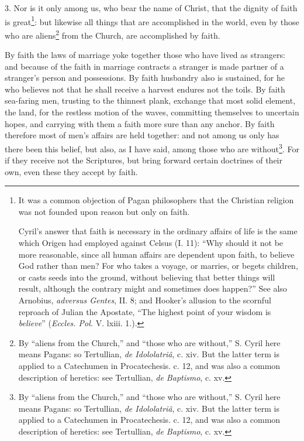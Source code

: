 3. Nor is it only among us, who bear the name of Christ, that the dignity of faith is great\footnote{It was a common objection of Pagan philosophers that the Christian religion was not founded upon reason but only on faith. \par Cyril’s answer that faith is necessary in the ordinary affairs of life is the same which Origen had employed against Celsus (I. 11): “Why should it not be more reasonable, since all human affairs are dependent upon faith, to believe God rather than men? For who takes a voyage, or marries, or begets children, or casts seeds into the ground, without believing that better things will result, although the contrary might and sometimes does happen?” See also Arnobius, \emph{adversus Gentes}, II. 8; and Hooker’s allusion to the scornful reproach of Julian the Apostate, “The highest point of your wisdom is \emph{believe}” (\emph{Eccles. Pol.} V. lxiii. 1.).}: but likewise all things that are accomplished in the world, even by those who are aliens\footnote{By “aliens from the Church,” and “those who are without,” S. Cyril here means Pagans: so Tertullian, \emph{de Idololatriâ}, c. xiv. But the latter term is applied to a Catechumen in Procatechesis. c. 12, and was also a common description of heretics: see Tertullian, \emph{de Baptismo}, c. xv.} from the Church, are accomplished by faith.

By faith the laws of marriage yoke together those who have lived as strangers: and because of the faith in marriage contracts a stranger is made partner of a stranger’s person and possessions. By faith husbandry also is sustained, for he who believes not that he shall receive a harvest endures not the toils. By faith sea-faring men, trusting to the thinnest plank, exchange that most solid element, the land, for the restless motion of the waves, committing themselves to uncertain hopes, and carrying with them a faith more sure than any anchor. By faith therefore most of men’s affairs are held together: and not among us only has there been this belief, but also, as I have said, among those who are without\footnote{By “aliens from the Church,” and “those who are without,” S. Cyril here means Pagans: so Tertullian, \emph{de Idololatriâ}, c. xiv. But the latter term is applied to a Catechumen in Procatechesis. c. 12, and was also a common description of heretics: see Tertullian, \emph{de Baptismo}, c. xv.}. For if they receive not the Scriptures, but bring forward certain doctrines of their own, even these they accept by faith.

